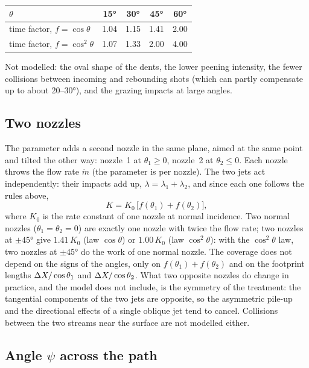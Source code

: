 \begin{center}\small
\begin{tabular}{@{}lcccc@{}}
\toprule
$\theta$ & 15° & 30° & 45° & 60°\\ \midrule
time factor, $f=\cos\theta$ & 1.04 & 1.15 & 1.41 & 2.00\\
time factor, $f=\cos^2\theta$ & 1.07 & 1.33 & 2.00 & 4.00\\ \bottomrule
\end{tabular}
\end{center}

\noindent Not modelled: the oval shape of the dents, the lower peening intensity, the fewer collisions between incoming and rebounding shots (which can partly compensate up to about 20--30°), and the grazing impacts at large angles.

\subsection*{Two nozzles}

The parameter  adds a second nozzle in the same plane, aimed at the same point and tilted the other way: nozzle~1 at $\theta_1\ge0$, nozzle~2 at $\theta_2\le0$. Each nozzle throws the flow rate $\dot m$ (the parameter is per nozzle). The two jets act independently: their impacts add up, $\lambda=\lambda_1+\lambda_2$, and since each one follows the rules above,
\begin{equation}
K=K_0\,\bigl[f(\theta_1)+f(\theta_2)\bigr],
\end{equation}
where $K_0$ is the rate constant of one nozzle at normal incidence. Two normal nozzles ($\theta_1=\theta_2=0$) are exactly one nozzle with twice the flow rate; two nozzles at $\pm45°$ give $1.41\,K_0$ (law $\cos\theta$) or $1.00\,K_0$ (law $\cos^2\theta$): with the $\cos^2\theta$ law, two nozzles at $\pm45°$ do the work of one normal nozzle. The coverage does not depend on the signs of the angles, only on $f(\theta_1)+f(\theta_2)$ and on the footprint lengths $\Delta X/\cos\theta_1$ and $\Delta X/\cos\theta_2$. What two opposite nozzles do change in practice, and the model does not include, is the symmetry of the treatment: the tangential components of the two jets are opposite, so the asymmetric pile-up and the directional effects of a single oblique jet tend to cancel. Collisions between the two streams near the surface are not modelled either.

\subsection*{Angle \texorpdfstring{$\psi$}{psi} across the path}

